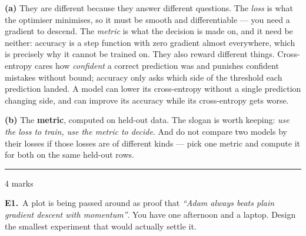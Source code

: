 \documentclass[10pt,a4paper]{article}
\newcommand{\parthead}[2]{\vspace{2pt}\noindent\rule{\linewidth}{0.4pt}\par\vspace{2pt}%
  \noindent{\bfseries Part #1}\hfill{\small #2}\par\vspace{1pt}}
\begin{document}
\textbf{(a)} They are different because they answer different questions. The \emph{loss} is what the optimiser minimises, so it must be smooth and differentiable --- you need a gradient to descend. The \emph{metric} is what the decision is made on, and it need be neither: accuracy is a step function with zero gradient almost everywhere, which is precisely why it cannot be trained on. They also reward different things. Cross-entropy cares how \emph{confident} a correct prediction was and punishes confident mistakes without bound; accuracy only asks which side of the threshold each prediction landed. A model can lower its cross-entropy without a single prediction changing side, and can improve its accuracy while its cross-entropy gets worse.\par\vspace{1mm}\textbf{(b)} The \textbf{metric}, computed on held-out data. The slogan is worth keeping: \emph{use the loss to train, use the metric to decide}. And do not compare two models by their losses if those losses are of different kinds --- pick one metric and compute it for both on the same held-out rows.

\newpage

\parthead{E --- Reasoning}{4 marks}

\textbf{E1.}\ A plot is being passed around as proof that \emph{``Adam always beats plain gradient descent with
momentum''}. You have one afternoon and a laptop. Design the smallest experiment that would actually settle
it.

\vspace{4pt}
\end{document}
